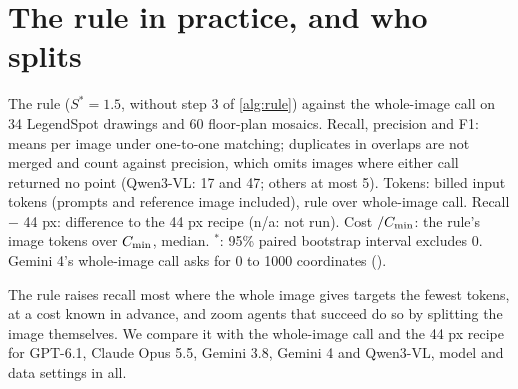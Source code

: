 \section{The rule in practice, and who splits}
\label{sec:practice}

\begin{table}[t]
\centering
\small
\begin{adjustbox}{max width=\linewidth}\end{adjustbox}
\caption{The rule ($S^\ast = 1.5$, without step 3 of \cref{alg:rule}) against the whole-image call on 34 LegendSpot drawings and 60 floor-plan mosaics. Recall, precision and F1: means per image under one-to-one matching; duplicates in overlaps are not merged and count against precision, which omits images where either call returned no point (Qwen3-VL: 17 and 47; others at most 5). Tokens: billed input tokens (prompts and reference image included), rule over whole-image call. Recall $-$ 44 px: difference to the 44 px recipe (n/a: not run). Cost $/\Cmin$: the rule's image tokens over $\Cmin$, median. ${}^\ast$: 95\% paired bootstrap interval excludes 0. Gemini 4's whole-image call asks for 0 to 1000 coordinates ().}
\label{tab:main}
\end{table}

The rule raises recall most where the whole image gives targets the fewest tokens, at a cost known in advance, and zoom agents that succeed do so by splitting the image themselves. We compare it with the whole-image call and the 44 px recipe for GPT-6.1, Claude Opus 5.5, Gemini 3.8, Gemini 4 and Qwen3-VL, \CtCells{} model and data settings in all.

